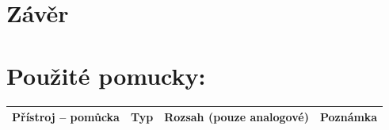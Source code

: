\documentclass[a4paper]{article}
\begin{document}
\section*{Závěr}
\section*{Použité pomucky:}
\begin{tabularx}{\linewidth}{c|c|c|c}
	Přístroj – pomůcka & Typ & Rozsah (pouze analogové)
	& Poznámka \\
	\hline
\end{tabularx}
\end{document}
